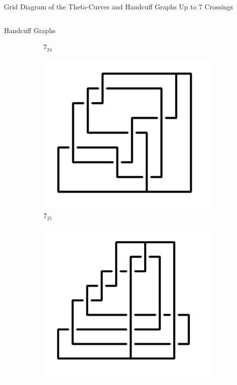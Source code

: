 \documentclass[final]{beamer}
\begin{document}
\begin{frame}[t]
\begin{alertblock}{Grid Diagram of the Theta-Curves and Handcuff Graphs Up to 7 Crossings}
\begin{columns}[t]
\begin{column}{0.5\textwidth}
\begin{alertblock}{Handcuff Graphs}
\begin{figure}
\begin{subfigure}{0.075\textwidth}
    \caption{$7_{24}$} 
    \end{subfigure}
    \begin{subfigure}{0.075\textwidth}
    \includegraphics[width=\columnwidth]{../Midterm_Poster/grid_diagram/handcuff_7_25.png}
    \caption{$7_{25}$} 
    \end{subfigure}
    \begin{subfigure}{0.075\textwidth}
    \includegraphics[width=\columnwidth]{../Midterm_Poster/grid_diagram/handcuff_7_26.png}

\end{subfigure}
\end{figure}
\end{alertblock}
\end{column}
\end{columns}
\end{alertblock}
\end{frame}
\end{document}
